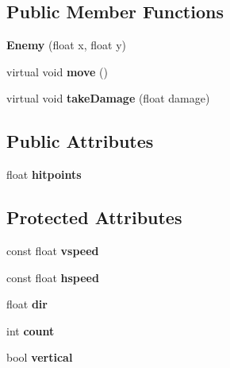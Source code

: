\subsection*{Public Member Functions}
\begin{DoxyCompactItemize}
\item 
\mbox{\label{classentities_1_1enemies_1_1Enemy_a0e3ad09de3d7cc19e5f01dd4d9424ee8}} 
{\bfseries Enemy} (float x, float y)
\item 
\mbox{\label{classentities_1_1enemies_1_1Enemy_a9a398f8d12234f02563b27440aff7891}} 
virtual void {\bfseries move} ()
\item 
\mbox{\label{classentities_1_1enemies_1_1Enemy_ae89eefd8e9478d7e4512bc24ca52a4b1}} 
virtual void {\bfseries take\+Damage} (float damage)
\end{DoxyCompactItemize}
\subsection*{Public Attributes}
\begin{DoxyCompactItemize}
\item 
\mbox{\label{classentities_1_1enemies_1_1Enemy_abb65eb4904db5b17e78037baba8c42e5}} 
float {\bfseries hitpoints}
\end{DoxyCompactItemize}
\subsection*{Protected Attributes}
\begin{DoxyCompactItemize}
\item 
\mbox{\label{classentities_1_1enemies_1_1Enemy_a2721c1375a8a67c1cb6e0c1bd5145b79}} 
const float {\bfseries vspeed}
\item 
\mbox{\label{classentities_1_1enemies_1_1Enemy_a71523230e1a995495e1079bd800101ca}} 
const float {\bfseries hspeed}
\item 
\mbox{\label{classentities_1_1enemies_1_1Enemy_a3e48faf63338b8dd57de1b197f1c4159}} 
float {\bfseries dir}
\item 
\mbox{\label{classentities_1_1enemies_1_1Enemy_a798310404e04fa3a626f9307e83e7362}} 
int {\bfseries count}
\item 
\mbox{\label{classentities_1_1enemies_1_1Enemy_ac930ca52dbc7affbd340eaac5b2a2b61}} 
bool {\bfseries vertical}
\end{DoxyCompactItemize}
